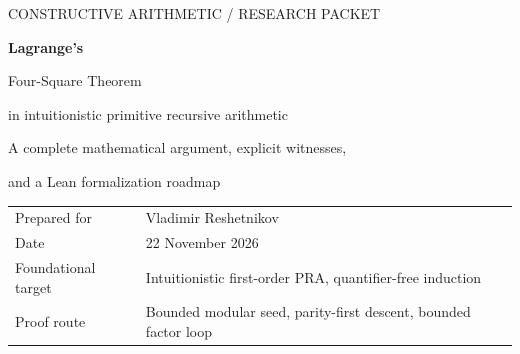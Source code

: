 \documentclass[11pt,letterpaper]{article}
\theoremstyle{definition}
\begin{document}
\hypersetup{pageanchor=false}
\begin{titlepage}
\vspace*{0.55in}
{\small\sffamily\color{accent}CONSTRUCTIVE ARITHMETIC \quad / \quad RESEARCH PACKET}
\vspace{0.25in}

{\Huge\bfseries\color{ink}Lagrange's\par Four-Square Theorem\par}
\vspace{0.18in}
{\Large in intuitionistic primitive recursive arithmetic\par}
\vspace{0.4in}
{\large A complete mathematical argument, explicit witnesses,\par
and a Lean formalization roadmap}
\vspace{0.35in}

\begin{abstract}
Every natural number is the sum of four squares, and this assertion admits
an explicitly witnessed proof in intuitionistic primitive recursive
arithmetic. We construct four primitive recursive functions $W_i$ and prove,
using only quantifier-free induction, that
\[
  W_0(n)^2+W_1(n)^2+W_2(n)^2+W_3(n)^2=n.
\]
The construction consists of a bounded residue search for each prime,
an explicit descent with separate even and odd multiplier branches, and a
bounded trial-factor loop for arbitrary inputs. The central descent is
iterated a prescribed number of times; all its invariants are arithmetic
equalities and decidable inequalities. Integer and tuple notation is reduced
to primitive recursive coding over the natural numbers.

The packet includes an exact-arithmetic Python implementation, reproducible
checks, uncompiled Lean source outlining the complete construction, and
pinned ProveIt interface references. The mathematical proof is supplied in
full. The Lean arithmetic obligations and the final syntactic iPRA derivation
remain to be mechanized; no completed machine verification is claimed.
\end{abstract}
\vfill
\begin{tabular}{@{}ll@{}}
Prepared for & Vladimir Reshetnikov\\
Date & 22 November 2026\\
Foundational target & Intuitionistic first-order PRA, quantifier-free induction\\
Proof route & Bounded modular seed, parity-first descent, bounded factor loop
\end{tabular}
\end{titlepage}
\hypersetup{pageanchor=true}
\begingroup
\small
\setlength{\parskip}{0pt}
\tableofcontents
\endgroup
\clearpage
{}
\end{document}
